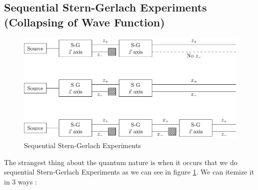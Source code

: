 \documentclass{article}
\begin{document}
\subsection{Sequential Stern-Gerlach Experiments \small{(Collapsing of Wave Function)}}
\begin{figure}[t]
    \centering
    \includegraphics[width=0.7\linewidth]{Sg-seq.pdf}
    \caption{Sequential Stern-Gerlach Experiments}
    \label{Sequential Stern-Gerlach Experiments}
\end{figure}
The strangest thing about the quantum nature is when it occurs that we do sequential Stern-Gerlach Experiments as we can see in figure \ref{Sequential Stern-Gerlach Experiments}. We can itemize it in 3 ways \cite{bookjeanbricmont}:
\end{document}
